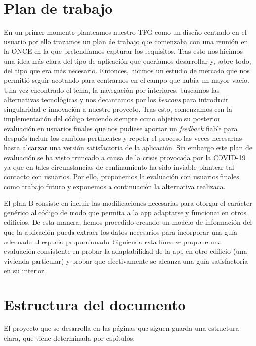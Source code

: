 \section{Plan de trabajo}
\label{sec:planTrabajo}

En un primer momento planteamos nuestro TFG como un diseño centrado en el usuario por ello trazamos un plan de trabajo que comenzaba con una reunión en la ONCE en la que pretendíamos capturar los requisitos. Tras esto nos hicimos una idea más clara del tipo de aplicación que queríamos desarrollar y, sobre todo, del tipo que era más necesario. Entonces, hicimos un estudio de mercado que nos permitió seguir acotando para centrarnos en el campo que hubía un mayor vacío. Una vez encontrado el tema, la navegación por interiores, buscamos las alternativas tecnológicas y nos decantamos por los \textit{beacons} para introducir singularidad e innovación a nuestro proyecto. Tras esto, comenzamos con la implementación del código teniendo siempre como objetivo su posterior evaluación en usuarios finales que nos pudiese aportar un \textit{feedback} fiable para después incluir los cambios pertinentes y repetir el proceso las veces necesarias hasta alcanzar una versión satisfactoria de la aplicación. Sin embargo este plan de evaluación se ha visto truncado a causa de la crisis provocada por la COVID-19 ya que en tales circunstancias de confinamiento ha sido inviable plantear tal contacto con usuarios. Por ello, proponemos la evaluación con usuarios finales como trabajo futuro y exponemos a continuación la alternativa realizada.

El plan B consiste en incluir las modificaciones necesarias para otorgar el carácter genérico al código de modo que permita a la app adaptarse y funcionar en otros edificios. De esta manera, hemos procedido creando un modelo de información del que la aplicación pueda extraer los datos necesarios para incorporar una guía adecuada al espacio proporcionado. Siguiendo esta línea se propone una evaluación consistente en probar la adaptabilidad de la app en otro edificio (una vivienda particular) y probar que efectivamente se alcanza una guía satisfactoria en su interior.



\section{Estructura del documento}

El proyecto que se desarrolla en las páginas que siguen guarda una estructura clara, que viene determinada por capítulos:

